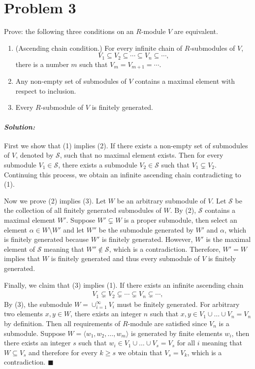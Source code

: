 \documentclass[12pt, a4paper]{article}
\theoremstyle{remark}
\newenvironment{solution}
  {\paragraph{\textit{Solution:}}\par\medskip}
  {\hfill$\blacksquare$\vspace{0.1cm}}
\begin{document}
\section*{Problem 3}
Prove: the following three conditions on an $R$-module $V$ are equivalent.
\begin{enumerate}
    \item[(1)] (Ascending chain condition.) For every infinite chain of $R$-submodules of $V$, 
    $$V_1 \subseteq V_2 \subseteq \cdots \subseteq V_n \subseteq \cdots,$$
    there is a number $m$ such that $V_m = V_{m+1} = \cdots$.
    \item[(2)] Any non-empty set of submodules of $V$ contains a maximal element with respect to inclusion.
    \item[(3)] Every $R$-submodule of $V$ is finitely generated.
\end{enumerate}
\begin{solution}
    First we show that (1) implies (2). If there exists a non-empty set of submodules of $V$, denoted by $\mathcal{S}$, such that no maximal element exists.
    Then for every submodule $V_1\in\mathcal{S}$, there exists a submodule $V_2\in\mathcal{S}$ such that $V_1\subsetneq V_2$. Continuing this process, we obtain an infinite ascending chain
    contradicting to (1).

    Now we prove (2) implies (3). Let $W$ be an arbitrary submodule of $V$. Let $\mathcal{S}$ be the collection of all finitely generated submodules of $W$. By (2), $\mathcal{S}$ contains a maximal element $W'$. Suppose $W'\subsetneq W$ is a proper submodule,
    then select an element $\alpha\in W\setminus W'$ and let $W''$ be the submodule generated by $W'$ and $\alpha$, which is finitely generated because $W'$ is finitely generated. However, $W'$ is the maximal element of $\mathcal{S}$
    meaning that $W''\notin \mathcal{S}$, which is a contradiction. Therefore, $W'=W$ implies that $W$ is finitely generated and thus
    every submodule of $V$ is finitely generated. 

    Finally, we claim that (3) implies (1). If there exists an infinite ascending chain 
    \begin{align*}
        V_1 \subsetneq V_2 \subsetneq \cdots \subsetneq V_n \subsetneq \cdots,
    \end{align*}
    By (3), the submodule $W= \cup_{i=1}^\infty V_i$ must be finitely generated.
    For arbitrary two elements $x,y\in W$, there exists an integer $n$ such that $x,y\in V_1\cup\dots\cup V_n= V_n$ by definition. Then all requirements of $R$-module are satisfied since $V_n$
    is a submodule. Suppose $W=\langle w_1, w_2, \dots, w_m \rangle$ is generated by finite elements $w_i$, then there exists an integer $s$ such that 
    $w_i\in V_1\cup\dots\cup V_s=V_s$ for all $i$ meaning that $W\subseteq V_s$ and therefore for every $k\ge s$ we obtain that $V_s=V_k$, which is a contradiction.
\end{solution}
\end{document}
